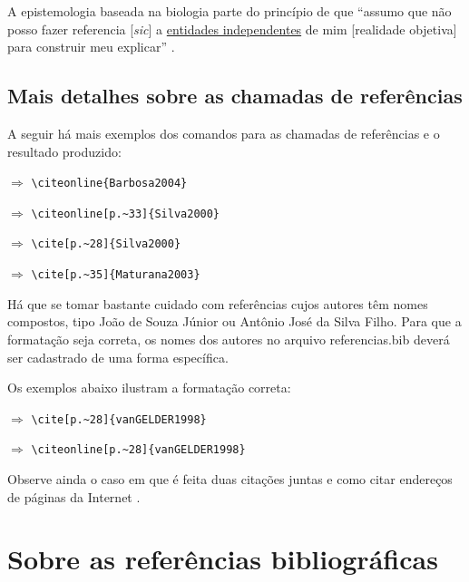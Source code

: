 \begin{apendicesenv}
    A epistemologia baseada na biologia parte do princípio de que ``assumo que não posso fazer referencia [\textit{sic}] a \underline{entidades independentes} de mim [realidade objetiva] para construir meu explicar'' \cite[p.~35, comentários e grifo nosso]{Maturana2003}.

    \section{Mais detalhes sobre as chamadas de referências}
    \label{sec_chamadas_referencias}

    A seguir há mais exemplos dos comandos para as chamadas de referências e o resultado produzido:

     $\Longrightarrow$ \verb|\citeonline{Barbosa2004}|

     $\Longrightarrow$ \verb|\citeonline[p.~33]{Silva2000}|

    \cite[p.~28]{Silva2000} $\Longrightarrow$ \verb|\cite[p.~28]{Silva2000}|

    \cite[p.~35]{Maturana2003} $\Longrightarrow$ \verb|\cite[p.~35]{Maturana2003}|

    \vspace{3em}

    Há que se tomar bastante cuidado com referências cujos autores têm nomes compostos, tipo João de Souza Júnior ou Antônio José da Silva Filho.
    Para que a formatação seja correta, os nomes dos autores no arquivo {\ttfamily referencias.bib} deverá ser cadastrado de uma forma específica.

    Os exemplos abaixo ilustram a formatação correta:

    \cite[p.~28]{vanGELDER1998} $\Longrightarrow$ \verb|\cite[p.~28]{vanGELDER1998}|

     $\Longrightarrow$ \verb|\citeonline[p.~28]{vanGELDER1998}|

    \vspace{3em}

    Observe ainda o caso em que é feita duas citações juntas \cite{Silva2000, Barbosa2004} e como citar endereços de páginas da Internet \cite{IRL2014}.


    \chapter{Sobre as referências bibliográficas}
    \label{chap_sobre_as_referencias_bibliograficas}


\end{apendicesenv}
